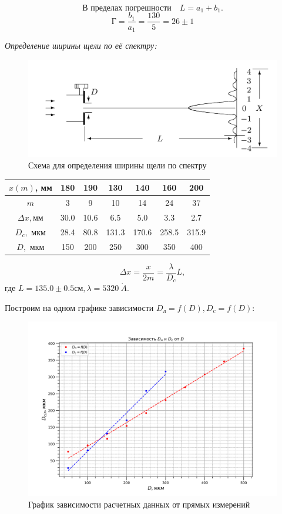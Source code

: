 \documentclass[a4paper, 12pt]{article}%
\newcommand{\RomanNumeralCaps}[1]{\uppercase\expandafter{\romannumeral#1}}
\begin{document}
	\[
	\text{В пределах погрешности} \quad  L = a_1 + b_1. \]
	\[ 
	\text{Г} = \frac{b_1}{a_1} = \frac{130}{5} = 26 \pm 1
	\]
	
	
	\newpage
\RomanNumeralCaps 2 \textit{Определение ширины щели по её спектру:}
	
	\begin{figure}[H]
		\begin{center}
		\includegraphics[width = 0.6\linewidth]{2.png}
		\caption*{Схема для определения ширины щели по спектру}
	\end{center}
	\end{figure}
	\begin{table}[H]
		\centering
		\begin{tabular}{|c|c|c|c|c|c|c|}  \hline
			$x(m)$, мм & 180 & 190& 130 & 140 & 160 & 200  \\\hline
			$m$ & 3 & 9 & 10 & 14 & 24 & 37\\\hline
			$\Delta x,$мм & 30.0 & 10.6 & 6.5 & 5.0 & 3.3 & 2.7 \\\hline
			$D_c,$ мкм & 28.4 & 80.8 & 131.3 & 170.6 & 258.5 & 315.9\\\hline
			$D,$ мкм & 150 & 200 & 250 & 300 & 350 & 400\\\hline
			
		\end{tabular}
	\end{table}
	\[
	\Delta x = \frac{x}{2m} = \frac{\lambda}{D_c}L,
	\]	
	где $L = 135.0 \pm 0.5 \text{см}, \lambda = 5320\ \dot A $.
	
	Построим на одном графике зависимости $D_{л} = f(D), D_{c} = f(D)$:
	\begin{figure}[H]
		\begin{center}
			\includegraphics[width=0.6\linewidth]{Dl_Dc.png}
			\caption{График зависимости расчетных данных от прямых измерений}
		\end{center}
	\end{figure}
	
\end{document}
